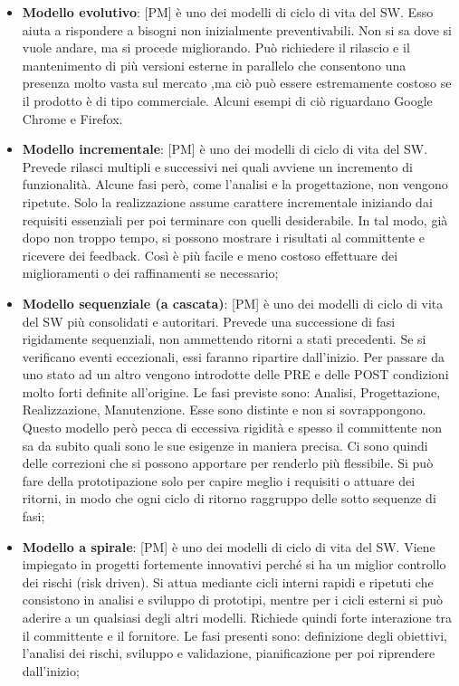 \begin{itemize}
	\item \textbf{Modello evolutivo}: [PM] è uno dei modelli di ciclo di vita del SW. Esso aiuta a rispondere a bisogni non inizialmente preventivabili. Non si sa dove si vuole andare, ma si procede migliorando. \newline
Può richiedere il rilascio e il mantenimento di più versioni esterne in parallelo che consentono una presenza molto vasta sul mercato ,ma ciò può essere estremamente costoso se il prodotto è di tipo commerciale. Alcuni esempi di ciò riguardano Google Chrome e Firefox.

	\item \textbf{Modello incrementale}: [PM] è uno dei modelli di ciclo di vita del SW. Prevede rilasci multipli e successivi nei quali avviene un incremento di funzionalità. \newline
Alcune fasi però, come l'analisi e la progettazione, non vengono ripetute. Solo la realizzazione assume carattere incrementale iniziando dai requisiti essenziali per poi terminare con quelli desiderabile. In tal modo, già dopo non troppo tempo, si possono mostrare i risultati al committente e ricevere dei feedback. \newline
Così è più facile e meno costoso effettuare dei miglioramenti o dei raffinamenti se necessario;

	\item \textbf{Modello sequenziale (a cascata)}: [PM] è uno dei modelli di ciclo di vita del SW più consolidati e autoritari. Prevede una successione di fasi rigidamente sequenziali, non ammettendo ritorni a stati precedenti. Se si verificano eventi eccezionali, essi faranno ripartire dall'inizio. \newline
Per passare da uno stato ad un altro vengono introdotte delle PRE e delle POST condizioni molto forti definite all'origine. Le fasi previste sono: Analisi, Progettazione, Realizzazione, Manutenzione. Esse sono distinte e non si sovrappongono. \newline
Questo modello però pecca di eccessiva rigidità e spesso il committente non sa da subito quali sono le sue esigenze in maniera precisa.\newline
Ci sono quindi delle correzioni che si possono apportare per renderlo più flessibile. Si può fare della prototipazione solo per capire meglio i requisiti o attuare dei ritorni, in modo che ogni ciclo di ritorno raggruppo delle sotto sequenze di fasi;

	\item \textbf{Modello a spirale}: [PM] è uno dei modelli di ciclo di vita del SW. Viene impiegato in progetti fortemente innovativi perché si ha un miglior controllo dei rischi (risk driven). \newline
Si attua mediante cicli interni rapidi e ripetuti che consistono in analisi e sviluppo di prototipi, mentre per i cicli esterni si può aderire a un qualsiasi degli altri modelli. \newline
Richiede quindi forte interazione tra il committente e il fornitore. Le fasi presenti sono: definizione degli obiettivi, l'analisi dei rischi, sviluppo e validazione, pianificazione per poi riprendere dall'inizio;



\end{itemize}
